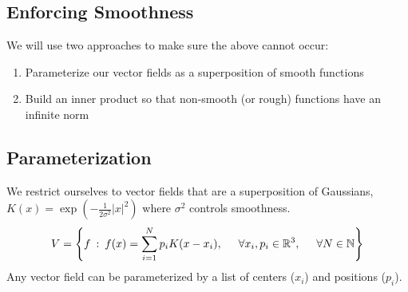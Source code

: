 \documentclass[10pt]{article}
\begin{document}
\subsection*{Enforcing Smoothness}
We will use two approaches to make sure the above cannot occur:
\begin{enumerate}
    \item Parameterize our vector fields as a superposition of smooth functions
    \item Build an inner product so that non-smooth (or rough) functions have an infinite norm
\end{enumerate}

\subsection*{Parameterization}
We restrict ourselves to vector fields that are a superposition of Gaussians, $K(x) = \exp(-\frac{1}{2\sigma^2} |x|^2)$ where $\sigma^2$ controls smoothness.
\[V = \left\{ f \::\: f(x) = \sum_{i = 1}^N p_i K(x - x_i), \hspace{0.5cm} \forall x_i, p_i \in \mathbb{R}^3, \hspace{0.5cm} \forall N \in \mathbb{N}\right\}\]
Any vector field can be parameterized by a list of centers ($x_i$) and positions ($p_i$).
\end{document}
